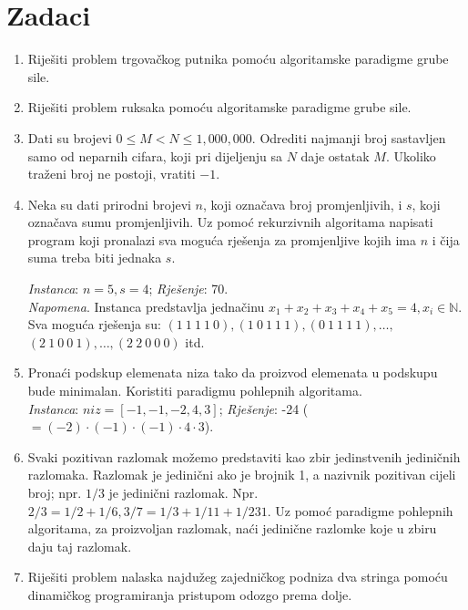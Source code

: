 \section*{Zadaci}

\begin{enumerate}
	\item Riješiti problem trgovačkog putnika pomoću algoritamske paradigme grube sile.
	\item Riješiti problem ruksaka pomoću algoritamske paradigme grube sile.
	\item Dati  su brojevi  $0 \leq  M  <  N  \leq  1,000,000$. Odrediti  najmanji  broj  sastavljen  samo  od 
	neparnih cifara, koji pri dijeljenju sa $N$ daje ostatak $M$. Ukoliko traženi broj ne postoji, vratiti $−1$. 
	
	 \item Neka su dati prirodni brojevi $n$, koji označava broj promjenljivih, i $s$, koji označava sumu promjenljivih. Uz
pomoć rekurzivnih algoritama napisati program koji pronalazi sva moguća rješenja
za promjenljive  kojih ima $n$ i  čija   suma treba biti jednaka $ s$. 

\textit{Instanca}: $n = 5, s = 4$;
\textit{Rješenje}: 70. \\
\textit{Napomena}.
Instanca predstavlja jednačinu $x_1 + x_2 + x_3 + x_4 + x_5 = 4, x_i \in \mathbb{N}$. 
Sva moguća rješenja su:
$(1\ 1\ 1\ 1\ 0), (1\ 0\ 1\ 1\ 1), (0\ 1\ 1\ 1\ 1), \ldots ,$ $(2\ 1\ 0\ 0\ 1), \ldots , (2\ 2\ 0\ 0\ 0)$ itd.
	\item Pronaći podskup elemenata niza tako da  proizvod elemenata u podskupu bude minimalan. Koristiti paradigmu pohlepnih algoritama.\\
	 \textit{Instanca}: $niz = [ -1, -1, -2, 4, 3]$; \textit{Rješenje}:  -24 ($=(-2 )\cdot (-1) \cdot (-1) \cdot 4 \cdot 3$). 
	
	\item Svaki pozitivan razlomak možemo predstaviti kao zbir jedi\-nstvenih jediničnih razlomaka. Razlomak je jedinični ako je brojnik 1, a nazivnik pozitivan cijeli broj; npr. $1/3$ je jedinični razlomak. Npr. $2/3= 1/2 + 1/6, 3/7=1/3 + 1/11 + 1/231.$   Uz pomoć paradigme pohlepnih algoritama, za proizvoljan razlomak, naći jedinične razlomke koje u zbiru daju taj razlomak.  
	
	
	\item Riješiti problem nalaska najdužeg zajedničkog podniza dva stringa pomoću dinamičkog programiranja pristupom odozgo prema dolje. 
	

\end{enumerate}
